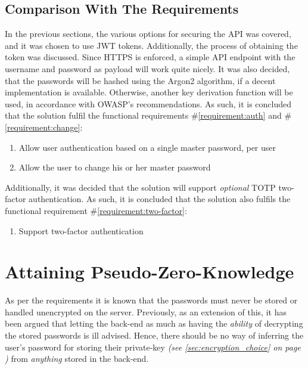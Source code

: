 		\subsection{Comparison With The Requirements}
			\label{requirement:fulfilled:auth}
			\label{requirement:fulfilled:change}
			\label{requirement:fulfilled:two-factor}
			In the previous sections, the various options for securing the API was covered, and it was chosen to use JWT tokens. Additionally, the process of obtaining the token was discussed. Since HTTPS is enforced, a simple API endpoint with the username and password as payload will work quite nicely. It was also decided, that the passwords will be hashed using the Argon2 algorithm, if a decent implementation is available. Otherwise, another key derivation function will be used, in accordance with OWASP's recommendations. As such, it is concluded that the solution fulfil the functional requirements \#\ref{requirement:auth} and \#\ref{requirement:change}:

			\vspace{-3ex}\begin{enumerate}
				\setlength\itemsep{0.1em}
				\setcounter{enumi}{14-1}
				\item Allow user authentication based on a single master password, per user
				\item Allow the user to change his or her master password
			\end{enumerate}

			Additionally, it was decided that the solution will support \emph{optional} TOTP two-factor authentication. As such, it is concluded that the solution also fulfils the functional requirement \#\ref{requirement:two-factor}:
			\vspace{-3ex}\begin{enumerate}
				\setlength\itemsep{0.1em}
				\setcounter{enumi}{16-1}
				\item Support two-factor authentication
			\end{enumerate}

	\section{Attaining Pseudo-Zero-Knowledge}
		\label{sec:design:pseudo-zero-knowledge}
		As per the requirements it is known that the passwords must never be stored or handled unencrypted on the server. Previously, as an extension of this, it has been argued that letting the back-end as much as having the \emph{ability} of decrypting the stored passwords is ill advised. Hence, there should be no way of inferring the user's password for storing their private-key \emph{(see \ref{sec:encryption_choice} on page \pageref{sec:encryption_choice})} from \emph{anything} stored in the back-end.

